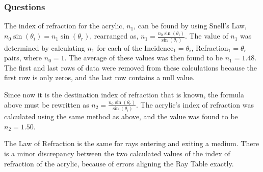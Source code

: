 \documentclass[12pt]{article}
\begin{document}
\subsubsection{Questions}

\subsubsubsection{}

The index of refraction for the acrylic, \(n_1\), can be found by using Snell's
Law, \(n_0 \sin{(\theta_i)} = n_1 \sin{(\theta_r)}\), rearranged as,
\(n_1 = \frac{n_0 \sin{(\theta_i)}}{\sin{(\theta_r)}}\). The value of \(n_1\)
was determined by calculating \(n_1\) for each of the
Incidence\(_1 = \theta_i\), Refraction\(_1 = \theta_r\) pairs, where
\(n_0 = 1\). The average of these values was then found to be \(n_1 =
1.48\). The first and last rows of data were removed from these calculations
because the first row is only zeros, and the last row contains a null value.

\subsubsubsection{}

Since now it is the destination index of refraction that is known, the formula
above must be rewritten as \(n_2 = \frac{n_0
  \sin{(\theta_r)}}{\sin{(\theta_i)}}\). The acrylic's index of
refraction was calculated using the same method as above, and the value was
found to be \(n_2 = 1.50\).

\subsubsubsection{}

The Law of Refraction is the same for rays entering and exiting a medium. There
is a minor discrepancy between the two calculated values of the index of
refraction of the acrylic, because of errors aligning the Ray Table exactly.

\subsubsubsection{}
\end{document}
